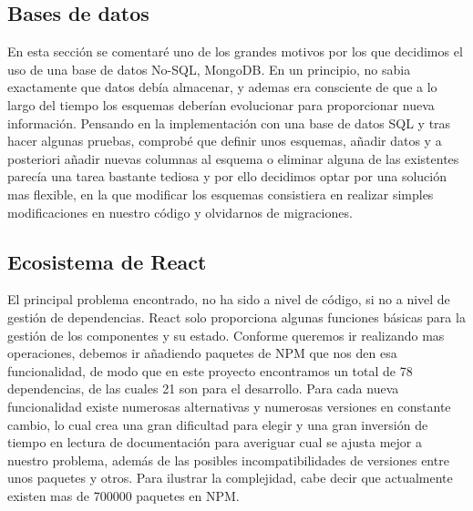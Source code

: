 \subsection {Bases de datos}
En esta sección se comentaré uno de los grandes motivos por los que decidimos el uso de una base de datos No-SQL, MongoDB. En un principio, no sabia exactamente que datos debía almacenar, y ademas era consciente de que a lo largo del tiempo los esquemas deberían evolucionar para proporcionar nueva información. Pensando en la implementación con una base de datos SQL y tras hacer algunas pruebas, comprobé que definir unos esquemas, añadir datos y a posteriori añadir nuevas columnas al esquema o eliminar alguna de las existentes parecía una tarea bastante tediosa y por ello decidimos optar por una solución mas flexible, en la que modificar los esquemas consistiera en realizar simples modificaciones en nuestro código y olvidarnos de migraciones.

\subsection {Ecosistema de React}
El principal problema encontrado, no ha sido a nivel de código, si no a nivel de gestión de dependencias. React solo proporciona algunas funciones básicas para la gestión de los componentes y su estado. Conforme queremos ir realizando mas operaciones, debemos ir añadiendo paquetes de NPM que nos den esa funcionalidad, de modo que en este proyecto encontramos un total de 78 dependencias, de las cuales 21 son para el desarrollo. Para cada nueva funcionalidad existe numerosas alternativas y numerosas versiones en constante cambio, lo cual crea una gran dificultad para elegir y una gran inversión de tiempo en lectura de documentación para averiguar cual se ajusta mejor a nuestro problema, además de las posibles incompatibilidades de versiones entre unos paquetes y otros. Para ilustrar la complejidad, cabe decir que actualmente existen mas de 700000 paquetes en NPM.



